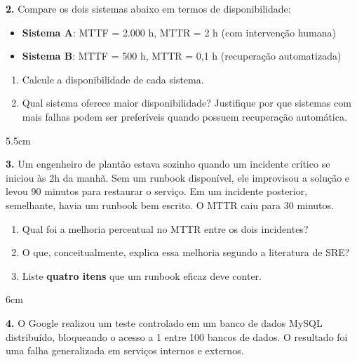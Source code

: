 \documentclass[12pt,a4paper]{report}
\begin{document}
\textbf{2.} Compare os dois sistemas abaixo em termos de disponibilidade:

\begin{itemize}
  \item \textbf{Sistema A}: MTTF = 2.000 h, MTTR = 2 h (com intervenção humana)
  \item \textbf{Sistema B}: MTTF = 500 h, MTTR = 0,1 h (recuperação automatizada)
\end{itemize}

\begin{enumerate}[label=\alph*)]
  \item Calcule a disponibilidade de cada sistema.
  \item Qual sistema oferece maior disponibilidade? Justifique por que sistemas com
        mais falhas podem ser preferíveis quando possuem recuperação automática.
\end{enumerate}
\begin{resposta}{5.5cm}
\end{resposta}

\vspace{0.5cm}

\textbf{3.} Um engenheiro de plantão estava sozinho quando um incidente crítico se iniciou às
2h da manhã. Sem um runbook disponível, ele improvisou a solução e levou 90 minutos
para restaurar o serviço. Em um incidente posterior, semelhante, havia um runbook bem
escrito. O MTTR caiu para 30 minutos.

\begin{enumerate}[label=\alph*)]
  \item Qual foi a melhoria percentual no MTTR entre os dois incidentes?
  \item O que, conceitualmente, explica essa melhoria segundo a literatura de SRE?
  \item Liste \textbf{quatro itens} que um runbook eficaz deve conter.
\end{enumerate}
\begin{resposta}{6cm}
\end{resposta}

\vspace{0.5cm}

\textbf{4.} O Google realizou um teste controlado em um banco de dados MySQL distribuído,
bloqueando o acesso a 1 entre 100 bancos de dados. O resultado foi uma falha generalizada
em serviços internos e externos.
\end{document}
